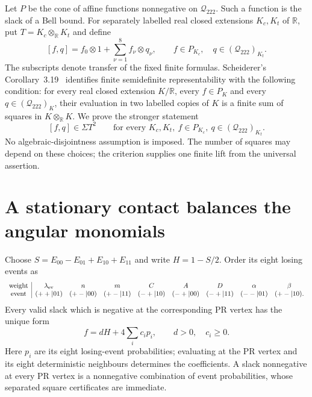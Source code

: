 Let $P$ be the cone of affine functions nonnegative on
$\mathcal Q_{222}$. Such a function is the slack of a Bell bound.
For separately labelled real closed extensions $K_c,K_t$ of
$\mathbb R$, put $T=K_c\otimes_{\mathbb R}K_t$ and define
\begin{equation}\label{eq:insight-tensor-slack}
 [f,q]=f_0\otimes1+\sum_{\nu=1}^8f_\nu\otimes q_\nu,
 \qquad f\in P_{K_c},\quad q\in(\mathcal Q_{222})_{K_t}.
\end{equation}
The subscripts denote transfer of the fixed finite formulas.
Scheiderer's Corollary~3.19~\cite{Scheiderer} identifies finite
semidefinite representability with the following condition:
for every real closed extension $K/\mathbb R$, every
$f\in P_K$ and every $q\in(\mathcal Q_{222})_K$, their evaluation
in two labelled copies of $K$ is a finite sum of squares in
$K\otimes_{\mathbb R}K$. We prove the stronger statement
\begin{equation}\label{eq:insight-universal-goal}
 [f,q]\in\Sigma T^2\qquad
 \text{for every }K_c,K_t,\ f\in P_{K_c},\ q\in(\mathcal Q_{222})_{K_t}.
\end{equation}
No algebraic-disjointness assumption is imposed. The number of
squares may depend on these choices; the criterion supplies one
finite lift from the universal assertion.

\section{A stationary contact balances the angular monomials}
\label{sec:insight-angular}

Choose
$S=E_{00}-E_{01}+E_{10}+E_{11}$ and write $H=1-S/2$.
Order its eight losing events as
\begingroup\setlength{\arraycolsep}{3pt}
\[
\begin{array}{c|cccccccc}
\text{weight}&\lambda_{\rm ev}&n&m&C&A&D&\alpha&\beta\\
\text{event}&(++|01)&(+-|00)&(+-|11)&(-+|10)&(-+|00)&(-+|11)&(--|01)&(+-|10).
\end{array}
\]
\endgroup
Every valid slack
which is negative at the corresponding PR vertex has the unique form
\begin{equation}\label{eq:insight-event-source}
 f=dH+4\sum_i c_i p_i,\qquad d>0,\quad c_i\ge0.
\end{equation}
Here $p_i$ are its eight losing-event probabilities; evaluating at
the PR vertex and its eight deterministic neighbours determines
the coefficients. A slack nonnegative at every PR vertex is a
nonnegative combination of event probabilities, whose separated
square certificates are immediate.

